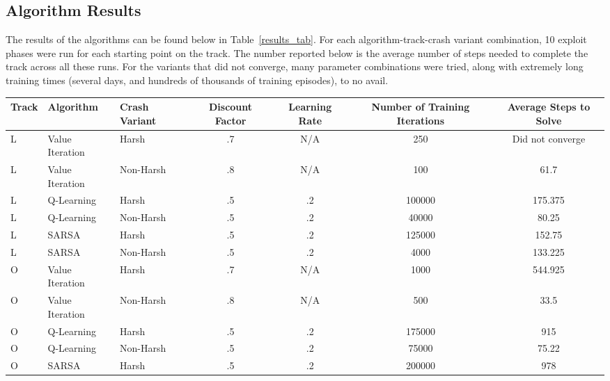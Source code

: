 \documentclass{amsart}
\begin{document}
    \subsection{Algorithm Results}
    The results of the algorithms can be found below in Table~\ref{results_tab}. For each
    algorithm-track-crash variant combination, 10 exploit phases were run for each
    starting point on the track. The number reported below is the average
    number of steps needed to complete the track across all these runs. For the
    variants that did not converge, many parameter combinations were tried, along
    with extremely long training times (several days, and hundreds of thousands of training episodes), to no avail.
    \begin{table}
    \begin{adjustbox}{width=1\textwidth}
        \small
    \begin{tabular}{lllcccc}
        Track & Algorithm & Crash Variant & Discount Factor & Learning Rate & Number of Training Iterations & Average Steps to Solve \\
        \hline
        L & Value Iteration & Harsh       & .7              & N/A           & 250 & Did not converge \\
        L & Value Iteration & Non-Harsh   & .8              & N/A           & 100 &  61.7 \\
        L & Q-Learning      & Harsh       & .5              & .2           & 100000 & 175.375 \\
        L & Q-Learning      & Non-Harsh   & .5              & .2           & 40000 & 80.25 \\
        L & SARSA           & Harsh       & .5              & .2           & 125000 & 152.75 \\
        L & SARSA           & Non-Harsh   & .5              & .2           & 4000 & 133.225 \\
        O & Value Iteration & Harsh       & .7              & N/A           & 1000 & 544.925 \\
        O & Value Iteration & Non-Harsh   & .8              & N/A           & 500 & 33.5 \\
        O & Q-Learning      & Harsh       & .5              & .2           & 175000 & 915 \\
        O & Q-Learning      & Non-Harsh   & .5              & .2           & 75000 & 75.22 \\
        O & SARSA           & Harsh       & .5              & .2           & 200000 & 978 \\

\end{tabular}
\end{adjustbox}
\end{table}
\end{document}
